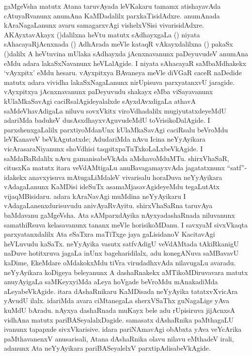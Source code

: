 gaMgeVsha matutx Atana taruvAyada leVKakaru tamamx atishayavAda cAtuyaR\-vanunx anumAna KaMDadalilx parxkaTisidAdxre. anumAnada kAraNagaLanunx avaru samagarxvAgi vishelxVSisi vivarisidAdxre. AKAyxtavAkayx ()dalilxna heVtu matutx sAdhayxgaLa () niyata sAhacayaRjAcnxnada () AdhArada meVle kataqR vAkayxdalilxna () pakaSx ()dalilx A heVtuvina mUlaka sAdhayxda jAcnxnavanunx paDeyuvudeV anumAna eMdu adara lakaSxNavanunx heVLalAgide. I niyata sAhacayaR saMbaMdhakekx `vAyxpitx' eMdu hesaru. vAyxpitxya BAvaneya meVle diVGaR caceR naDedide matutx adara vividha lakaSxNagaLanunx nirUpisuva parxyatanxvU jaragide. vAyxpitxya jAcnxnavanunx paDeyuvudu shakayx eMba viSayavanunx kUlaMkaSavAgi caciRsalAgideyalalxde sAyxdAvxdigaLa athavA saMdeVhavAdigaLa niluvu sovxVkitx viroVdhadalilx mugiyutatxdeyeMdU adariMda badukeV dusAsxdhayxvAguvudeMdU toVrisikoDalAgide. I parxshenxgaLalilx parxtiyoMdanUnx kUlaMkaSavAgi caciRsalu beVroMdu leVKanaveV beVkAgutatxde; AdudariMda nAvu Icina neYyAyikara vicArasaraNiyanunx shoVdhisi taqpitxpaTuTxkoLaLxbeVkAgide. I saMdaBaRdalilx nAvu gamanisabeVkAda aMshavoMduMTu. shirxVhaSaR, citusxKa matutx itara veVdAMtigaLu anuBavagamayxvAda jagatatxnunx ``satf''-idakekx anavxyisuva mAtugaLiMdaleV vivarisalu horaDuva neYyAyikara vAdagaLanunx KaMDisi ideSuTx asamaMjasavAgideyeMdu tegaLutAtx vijaqMBisidaru. adara kAraNavAgi muMdina neYyAyikaru I vAdagaLanenxdurisuvudu anivAyaRvAyitu. shirxVhaSaRna taruvAya baMdavanu gaMgeVsha. Ata sAMparxdAyika nAyxyadashaRnada niluvanunx samathiRsuva kelasavanunx tananx meVle horisikoMDanu. I savxyaM sivxVkaqta parxyatanxdalilx Ata eSaTxra maTiTxge jaya gaLisidanoV KacitavAgi heVLuvudu kaSaTx. neYyAyika vasutx satfvAdigU veVdAMtada tAkiRkanigU naDuve hotitxruva jagaLa inUnx bageharidilalx, adu konegANuva saMBavavU kaDime, EkeMdare oMdakokxMdu tiVra virudadhxvAda nilavugaLu avaradu. neYyAyikara koDigeya beleyanunx A dashaRnakekx aMTikoMDiruvavara matutx anuyAyigaLa saMKeyxyiMda aLeya hoVgade beVroMdu mAnakadiMda aLeyabeVkAgide. itara dAshaRnikaru KaMDisada neYyAyika tatatxvXvicAra yAvudU ilalx. idariMda avara ciMtanegaLa sherxVSaThx guNagaLige yAva kuMdU bAradu. nAyxya dashaRnada muKayx bele adu rUpisiruva jijAcnxsA vidhAna matutx pariBASeyalalxDagide. samasatx dAshaRnika paMthagaLU ivanunx tapapxde sivxVkarisive. idara pariNAmavAgi obAbxta yAva veYcArika paMthavanenxV anusarisali, Atana dAshaRnika olavu nilavu eMthadeV irali, adanunx Ata neYyAyikara pariBASeyalelxV parxtipAdisabeVkAgide.


